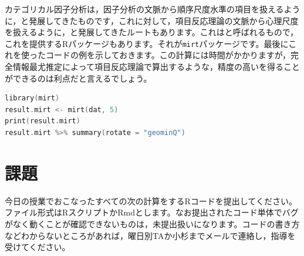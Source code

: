 \documentclass{ltjsbook}
\begin{document}
カテゴリカル因子分析は，因子分析の文脈から順序尺度水準の項目を扱えるように，と発展してきたものです，これに対して，項目反応理論の文脈から心理尺度を扱えるように，と発展してきたルートもあります。これはと呼ばれるもので，これを提供するRパッケージもあります。それが\texttt{mirt}パッケージ\textcite{mirt}です。最後にこれを使ったコードの例を示しておきます。この計算には時間がかかりますが，完全情報最尤推定によって項目反応理論で算出するような，精度の高いを得ることができるのは利点だと言えるでしょう。

\begin{lstlisting}[language=c++,label={code:11_06b},caption={mirtの実行}]
library(mirt)
result.mirt <- mirt(dat, 5)
print(result.mirt)
result.mirt %>% summary(rotate = "geominQ")
\end{lstlisting}


\section{課題}
今日の授業でおこなったすべての次の計算をするRコードを提出してください。ファイル形式はRスクリプトかRmdとします。なお提出されたコード単体でバグがなく動くことが確認できないものは，未提出扱いになります。コードの書き方などわからないところがあれば，曜日別TAか小杉までメールで連絡し，指導を受けてください。
\end{document}
